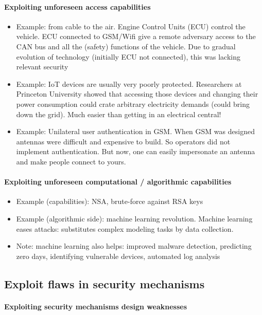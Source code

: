 \documentclass{article}
\newenvironment{myitemize}
{ \begin{itemize}
    \setlength{\itemsep}{005pt}
    \setlength{\parskip}{0pt}
    \setlength{\parsep}{0pt}     }
{ \end{itemize}                  }
\begin{document}
\begin{multicols}{2}
\paragraph{Exploiting unforeseen access capabilities}

\begin{myitemize}
    \item Example: from cable to the air. Engine Control Units (ECU) control the vehicle.  ECU connected to GSM/Wifi give a remote adversary access to the CAN bus and all the (safety) functions of the vehicle. Due to gradual evolution of technology (initially ECU not connected), this was lacking relevant security 
    \item Example: IoT devices are usually very poorly protected. Researchers at Princeton University showed that accessing those devices and changing their power consumption could crate arbitrary electricity demands (could bring down the grid). Much easier than getting in an electrical central!
    \item Example: Unilateral user authentication in GSM. When GSM was designed antennas were difficult and expensive to build. So operators did not implement authentication. But now, one can easily impersonate an antenna and make people connect to yours. 
\end{myitemize}


\paragraph{Exploiting unforeseen computational / algorithmic capabilities}

\begin{myitemize}
    \item Example (capabilities): NSA, brute-force against RSA keys
    \item Example (algorithmic side): machine learning revolution. Machine learning eases attacks: substitutes complex modeling tasks by data collection. 
    \item Note: machine learning also helps: improved malware detection, predicting zero days, identifying vulnerable devices, automated log analysis
\end{myitemize}


\subsection{Exploit flaws in security mechanisms}

\paragraph{Exploiting security mechanisms design weaknesses}


\end{multicols}
\end{document}
